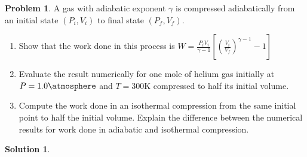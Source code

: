 \documentclass[10pt]{article}
\theoremstyle{definition}
\newtheorem{problem}{Problem}
\newtheorem{soln}{Solution}
\begin{document}
\begin{problem}
  A gas with adiabatic exponent $\gamma$ is compressed adiabatically from an initial state $(P_i, V_i)$ to final state $(P_f, V_f)$. 
  \begin{enumerate}[label=(\alph*)]
    \item Show that the work done in this process is $W=\displaystyle\frac{P_iV_i}{\gamma-1}\left[\left(\frac{V_i}{V_f}\right)^{\gamma-1}-1\right]$
    \item Evaluate the result numerically for one mole of helium gas initially at $P=1.0\unit{\atmosphere}$ and $T=300\unit{\kelvin}$ compressed to half its initial volume. 
    \item Compute the work done in an isothermal compression from the same initial point to half the initial volume. 
    Explain the difference between the numerical results for work done in adiabatic and isothermal compression.
  \end{enumerate}
\end{problem}
\begin{soln}
\end{soln}
\end{document}

